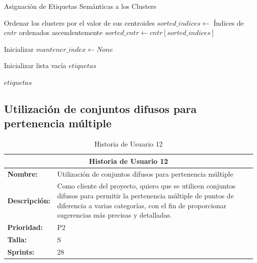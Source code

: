 \begin{algorithm}[H]
\caption{Asignación de Etiquetas Semánticas a los Clusters}
\label{alg:asignacion_etiquetas}


Ordenar los clusters por el valor de sus centroides\;
$sorted\_indices \leftarrow$ Índices de $cntr$ ordenados ascendentemente\;
$sorted\_cntr \leftarrow cntr[sorted\_indices]$\;

Inicializar $mantener\_index \leftarrow None$\;


Inicializar lista vacía $etiquetas$\;


\Return $etiquetas$\;
\end{algorithm}




\subsection{Utilización de conjuntos difusos para pertenencia múltiple}
\begin{table}[H]
\centering
\begin{tabular}{|l|p{10cm}|}
\hline
\multicolumn{2}{|c|}{\textbf{Historia de Usuario 12}} \\ \hline
\textbf{Nombre:} & Utilización de conjuntos difusos para pertenencia múltiple \\ \hline
\textbf{Descripción:} & Como cliente del proyecto, quiero que se utilicen conjuntos difusos para permitir la pertenencia múltiple de puntos de diferencia a varias categorías, con el fin de proporcionar sugerencias más precisas y detalladas. \\ \hline
\textbf{Prioridad:} & P2 \\ \hline
\textbf{Talla:} & S \\ \hline
\textbf{Sprints:} & 28 \\ \hline
\end{tabular}
\caption{Historia de Usuario 12}
\label{tab:utilizacion_conjuntos_difusos}
\end{table}

